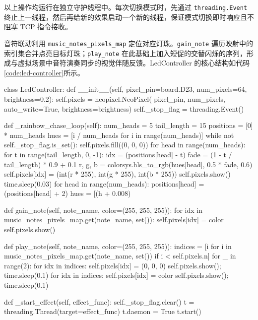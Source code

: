 \documentclass[bachelor]{njupthesis}
\begin{document}
以上操作均运行在独立守护线程中。每次切换模式时，先通过 \texttt{threading.Event} 终止上一线程，然后再给新的效果启动一个新的线程，保证模式切换即时响应且不阻塞 TCP 指令接收。

音符联动利用 \texttt{music\_notes\_pixels\_map} 定位对应灯珠。\texttt{gain\_note} 遍历映射中的索引集合并点亮目标灯珠；\texttt{play\_note} 在此基础上加入短促的交替闪烁的序列，形成与虚拟场景中音符演奏同步的视觉伴随反馈。LedController 的核心结构如代码\ref{code:led-controller}所示。

\begin{code}
\caption{LedController 灯光控制器核心实现}
\label{code:led-controller}
\begin{codebox}
class LedController:
    def __init__(self, pixel_pin=board.D23, num_pixels=64, brightness=0.2):
        self.pixels = neopixel.NeoPixel(
            pixel_pin, num_pixels, auto_write=True, brightness=brightness)
        self._stop_flag = threading.Event()

    def _rainbow_chase_loop(self):
        num_heads = 5
        tail_length = 15
        positions = [0] * num_heads
        hues = [i / num_heads for i in range(num_heads)]
        while not self._stop_flag.is_set():
            self.pixels.fill((0, 0, 0))
            for head in range(num_heads):
                for t in range(tail_length, 0, -1):
                    idx = (positions[head] - t) %
                    fade = (1 - t / tail_length) * 0.9 + 0.1
                    r, g, b = colorsys.hls_to_rgb(hues[head], 0.5 * fade, 0.6)
                    self.pixels[idx] = (int(r * 255), int(g * 255), int(b * 255))
            self.pixels.show()
            time.sleep(0.03)
            for head in range(num_heads):
                positions[head] = (positions[head] + 2) %
            hues = [(h + 0.008) %

    def gain_note(self, note_name, color=(255, 255, 255)):
        for idx in music_notes_pixels_map.get(note_name, set()):
            self.pixels[idx] = color
        self.pixels.show()

    def play_note(self, note_name, color=(255, 255, 255)):
        indices = [i for i in music_notes_pixels_map.get(note_name, set())
                   if i < self.pixels.n]
        for _ in range(2):
            for idx in indices:
                self.pixels[idx] = (0, 0, 0)
            self.pixels.show(); time.sleep(0.1)
            for idx in indices:
                self.pixels[idx] = color
            self.pixels.show(); time.sleep(0.1)

    def _start_effect(self, effect_func):
        self._stop_flag.clear()
        t = threading.Thread(target=effect_func)
        t.daemon = True
        t.start()
\end{codebox}
\end{code}
\end{document}
